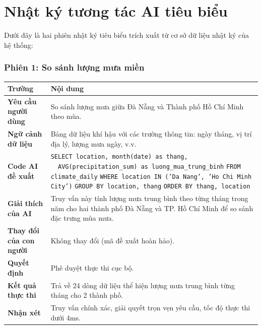 \chapter{Nhật ký tương tác AI tiêu biểu}
\label{app:ai-logs}

Dưới đây là hai phiên nhật ký tiêu biểu trích xuất từ cơ sở dữ liệu nhật ký của hệ thống:

\subsection*{Phiên 1: So sánh lượng mưa miền}
\begin{table}[htbp]
\centering
\renewcommand{\arraystretch}{1.25}
\begin{tabularx}{\textwidth}{|>{\bfseries}p{}|X|}
\hline
\textbf{Trường} & \textbf{Nội dung} \\ \hline
Yêu cầu người dùng
    & So sánh lượng mưa giữa Đà Nẵng và Thành phố Hồ Chí Minh theo mùa. \\ \hline
Ngữ cảnh dữ liệu
    & Bảng dữ liệu khí hậu với các trường thông tin: ngày tháng, vị trí địa lý, lượng mưa ngày, v.v. \\ \hline
Code AI đề xuất
    & \texttt{SELECT location, month(date) as thang,} \newline
      \texttt{~~AVG(precipitation\_sum) as luong\_mua\_trung\_binh} \newline
      \texttt{FROM climate\_daily} \newline
      \texttt{WHERE location IN ('Da Nang', 'Ho Chi Minh City')} \newline
      \texttt{GROUP BY location, thang} \newline
      \texttt{ORDER BY thang, location} \\ \hline
Giải thích của AI
    & Truy vấn này tính lượng mưa trung bình theo từng tháng trong năm cho hai thành phố Đà Nẵng và TP. Hồ Chí Minh để so sánh đặc trưng mùa mưa. \\ \hline
Thay đổi của con người
    & Không thay đổi (mã đề xuất hoàn hảo). \\ \hline
Quyết định
    & Phê duyệt thực thi cục bộ. \\ \hline
Kết quả thực thi & Trả về 24 dòng dữ liệu thể hiện lượng mưa trung bình từng tháng cho 2 thành phố. \\ \hline
Nhận xét & Truy vấn chính xác, giải quyết trọn vẹn yêu cầu, tốc độ thực thi dưới 4ms. \\ \hline
\end{tabularx}
\end{table}

